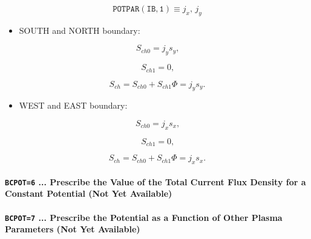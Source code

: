 \documentclass[11pt]{article}
\begin{document}
\bigskip

\begin{equation}
\mathtt{POTPAR(IB,1)}\equiv j_{x}\text{, }j_{y}   \label{c330}
\end{equation}

\bigskip

\begin{itemize}
\item  SOUTH and NORTH boundary:
\end{itemize}

\begin{equation}
S_{ch0}=j_{y}s_{y}\text{,}   \label{c331}
\end{equation}

\begin{equation}
S_{ch1}=0\text{,}   \label{c332}
\end{equation}

\begin{equation}
S_{ch}=S_{ch0}+S_{ch1}\Phi=j_{y}s_{y}\text{.}   \label{c333}
\end{equation}

\bigskip

\begin{itemize}
\item  WEST and EAST boundary:
\end{itemize}

\begin{equation}
S_{ch0}=j_{x}s_{x}\text{,}   \label{c334}
\end{equation}

\begin{equation}
S_{ch1}=0\text{,}   \label{c335}
\end{equation}

\begin{equation}
S_{ch}=S_{ch0}+S_{ch1}\Phi=j_{x}s_{x}\text{.}   \label{c336}
\end{equation}

\bigskip

\bigskip

\paragraph{\texttt{BCPOT=6} ... Prescribe the Value of the Total Current
Flux Density for a Constant Potential (Not Yet Available)}

\bigskip

\bigskip

\paragraph{\texttt{BCPOT=7} ... Prescribe the Potential as a Function of
Other Plasma Parameters (Not Yet Available)}
\end{document}
